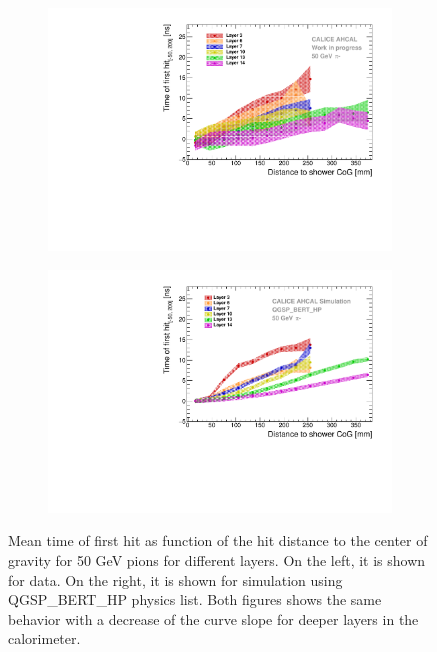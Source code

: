 \begin{figure}[htbp!]
	\begin{subfigure}[t]{0.5\textwidth}
		\centering
		\includegraphics[width=1\textwidth]{../Thesis_Plots/Timing/Pions/Plots/Timing_Radius_Comparison_ShortAsymRange_IndividualLayers.pdf}
		\caption{}\label{fig:Radius_Indivi}
	\end{subfigure}
	\hfill
	\begin{subfigure}[t]{0.5\textwidth}
		\centering
		\includegraphics[width=1\textwidth]{../Thesis_Plots/Timing/Pions/Plots/Timing_Radius_Comparison_ShortAsymRange_IndividualLayers_Sim.pdf}
		\caption{}\label{fig:Radius_Indivi_Sim}
	\end{subfigure}
	\caption{Mean time of first hit as function of the hit distance to the center of gravity for 50 GeV pions for different layers. On the left, it is shown for data. On the right, it is shown for simulation using QGSP\_BERT\_HP physics list. Both figures shows the same behavior with a decrease of the curve slope for deeper layers in the calorimeter.}
	\label{fig:Radius_IndiviAll}
\end{figure}

